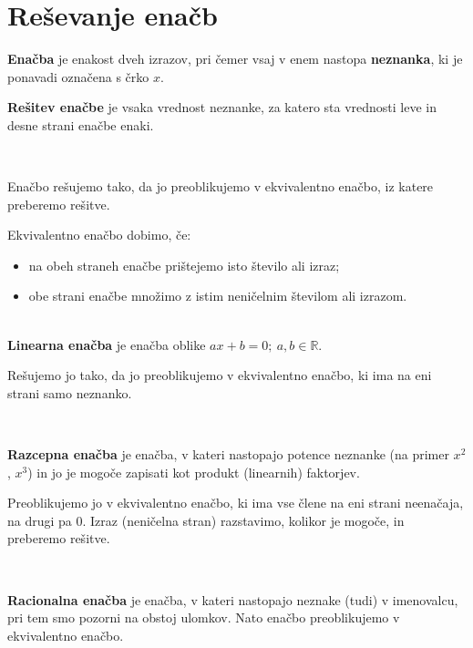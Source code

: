     \newpage

    \section{Reševanje enačb}

        
                \textbf{Enačba} je enakost dveh izrazov, pri čemer vsaj v enem nastopa \textbf{neznanka}, ki je ponavadi označena s črko $x$.

                \textbf{Rešitev enačbe} je vsaka vrednost neznanke, za katero sta vrednosti leve in desne strani enačbe enaki.
            
~

                Enačbo rešujemo tako, da jo preoblikujemo v ekvivalentno enačbo, iz katere preberemo rešitve.

                Ekvivalentno enačbo dobimo, če:
                \begin{itemize}
                    \item na obeh straneh enačbe prištejemo isto število ali izraz;
                    \item obe strani enačbe množimo z istim neničelnim številom ali izrazom.
                \end{itemize}
            
        
                ~~\\
        
                \textbf{Linearna enačba} je enačba oblike $ax+b=0;~a,b\in\mathbb{R}$.

                Rešujemo jo tako, da jo preoblikujemo v ekvivalentno enačbo, ki ima na eni strani samo neznanko.
            
~~

                \textbf{Razcepna enačba} je enačba, v kateri nastopajo potence neznanke (na primer $x^2$, $x^3$) in jo je mogoče zapisati kot produkt (linearnih) faktorjev.

                Preoblikujemo jo v ekvivalentno enačbo, ki ima vse člene na eni strani neenačaja, na drugi pa $0$. 
                Izraz (neničelna stran) razstavimo, kolikor je mogoče, in preberemo rešitve.
            
~~

                \textbf{Racionalna enačba} je enačba, v kateri nastopajo neznake (tudi) v imenovalcu, pri tem smo pozorni na obstoj ulomkov. 
                Nato enačbo preoblikujemo v ekvivalentno enačbo.
            

        ~~~\\~\\



